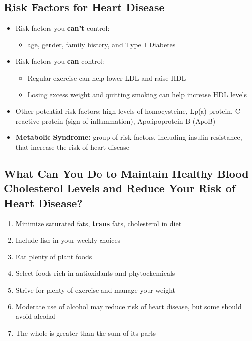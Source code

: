\documentclass[12pt]{article}
\begin{document}
        \subsection{Risk Factors for Heart Disease}
            \begin{itemize}
                \item Risk factors you \textbf{can't} control:
                    \begin{itemize}
                        \item age, gender, family history, and Type 1 Diabetes
                    \end{itemize}
                \item Risk factors you \textbf{can} control:
                    \begin{itemize}
                        \item Regular exercise can help lower LDL and raise HDL
                        \item Losing excess weight and quitting smoking can help increase HDL levels
                    \end{itemize}
                \item Other potential risk factors: high levels of homocysteine, Lp(a) protein, C-reactive protein (sign of inflammation), Apolipoprotein B (ApoB)
                \item \textbf{Metabolic Syndrome:} group of risk factors, including insulin resistance, that increase the risk of heart disease
            \end{itemize}

        \subsection{What Can You Do to Maintain Healthy Blood Cholesterol Levels and Reduce Your Risk of Heart Disease?}
            \begin{enumerate}
                \item Minimize saturated fats, \textbf{trans} fats, cholesterol in diet
                \item Include fish in your weekly choices
                \item Eat plenty of plant foods
                \item Select foods rich in antioxidants and phytochemicals
                \item Strive for plenty of exercise and manage your weight
                \item Moderate use of alcohol may reduce risk of heart disease, but some should avoid alcohol
                \item The whole is greater than the sum of its parts
            \end{enumerate}
\end{document}
